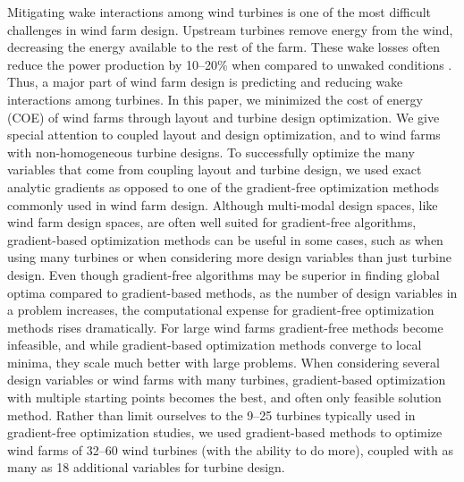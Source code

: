 
Mitigating wake interactions among wind turbines is one of the most difficult challenges in wind farm design. Upstream turbines remove energy from the wind, decreasing the energy available to the rest of the farm. These wake losses often reduce the power production by 10--20\% when compared to unwaked conditions \citep{barthelmie2007modelling,barthelmie2009modelling,briggs2013navigating}. 
Thus, a major part of wind farm design is predicting and reducing wake interactions among turbines. 
In this paper, we minimized the cost of energy (COE) of wind farms through layout and turbine design optimization. We give special attention to coupled layout and design optimization, and to wind farms with non-homogeneous turbine designs.
To successfully optimize the many variables that come from coupling layout and turbine design, we used exact analytic gradients as opposed to one of the gradient-free optimization methods commonly used in wind farm design.
Although multi-modal design spaces, like wind farm design spaces, are often well suited for gradient-free algorithms, gradient-based optimization methods can be useful in some cases, such as when using many turbines or when considering more design variables than just turbine design. Even though gradient-free algorithms may be superior in finding global optima compared to gradient-based methods, as the number of design variables in a problem increases, the computational expense for gradient-free optimization methods rises dramatically. 
For large wind farms gradient-free methods become infeasible, and while gradient-based optimization methods converge to local minima, they scale much better with large problems.
When considering several design variables or wind farms with many turbines,
gradient-based optimization with multiple starting points becomes the best, and often only feasible solution method. Rather than limit ourselves to the 9--25 turbines typically used in gradient-free optimization studies, we used gradient-based methods to optimize wind farms of 32--60 wind turbines (with the ability to do more), coupled with as many as 18 additional variables for turbine design.


